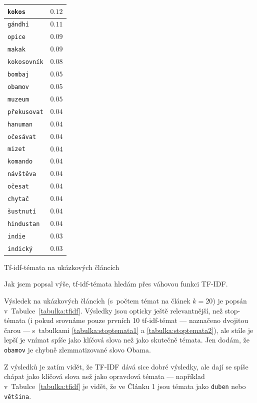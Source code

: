 \documentclass[12pt,a4paper]{report}
\begin{document}
{\begin{tabular}{ |l | r | }
        
        \texttt{kokos} & $0.12$ \\ \hline
        \texttt{gándhí} & $0.11$ \\ \hline
        \texttt{opice} & $0.09$ \\ \hline
        \texttt{makak} & $0.09$ \\ \hline
        \texttt{kokosovník} & $0.08$ \\ \hline
        \texttt{bombaj} & $0.05$ \\ \hline
        \texttt{obamov} & $0.05$ \\ \hline
        \texttt{muzeum} & $0.05$ \\ \hline
        \texttt{překusovat} & $0.04$ \\ \hline
        \texttt{hanuman} & $0.04$ \\ \hline
        \hline
        \texttt{očesávat} & $0.04$ \\ \hline
        \texttt{mizet} & $0.04$ \\ \hline
        \texttt{komando} & $0.04$ \\ \hline
        \texttt{návštěva} & $0.04$ \\ \hline
        \texttt{očesat} & $0.04$ \\ \hline
        \texttt{chytač} & $0.04$ \\ \hline
        \texttt{šustnutí} & $0.04$ \\ \hline
        \texttt{hindustan} & $0.04$ \\ \hline
        \texttt{indie} & $0.03$ \\ \hline
        \texttt{indický} & $0.03$ \\ \hline
        
        
      \end{tabular}


} {Tf-idf-témata na ukázkových článcích}


Jak jsem popsal výše, tf-idf-témata hledám přes váhovou funkci TF-IDF. 

Výsledek na ukázkových článcích (s~počtem témat na článek $k=20$) je popsán v~Tabulce~\ref{tabulka:tfidf}. Výsledky jsou opticky ještě relevantnější, než stop-témata (i pokud srovnáme pouze prvních 10 tf-idf-témat --- naznačeno dvojitou čarou --- s~tabulkami \ref{tabulka:stoptemata1} a \ref{tabulka:stoptemata2}), ale stále je lepší je vnímat spíše jako klíčová slova než jako skutečně témata. Jen dodám, že \texttt{obamov} je chybně zlemmatizované slovo Obama.


Z výsledků je zatím vidět, že TF-IDF dává sice dobré výsledky, ale dají se spíše chápat jako klíčová slova než jako opravdová témata --- například v~Tabulce~\ref{tabulka:tfidf} je vidět, že ve Článku 1 jsou témata jako \texttt{duben} nebo \texttt{většina}.
\end{document}
